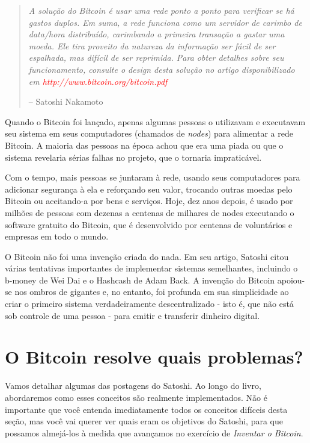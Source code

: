 \begin{quotation}
\begin{samepage}
{\textit{A solução do Bitcoin é usar uma rede ponto a ponto para verificar se há gastos duplos. Em suma, a rede funciona como um servidor de carimbo de data/hora distribuído, carimbando a primeira transação a gastar uma moeda. Ele tira proveito da natureza da informação ser fácil de ser espalhada, mas difícil de ser reprimida. Para obter detalhes sobre seu funcionamento, consulte o design desta solução no artigo disponibilizado em
\newline \textcolor{red}{http://www.bitcoin.org/bitcoin.pdf}}}
\begin{flushright} -- Satoshi Nakamoto
\end{flushright}\end{samepage}\end{quotation}

Quando o Bitcoin foi lançado, apenas algumas pessoas o utilizavam e executavam seu sistema em seus computadores (chamados de \textit{nodes}) para alimentar a rede Bitcoin. A maioria das pessoas na época achou que era uma piada ou que o sistema revelaria sérias falhas no projeto, que o tornaria impraticável.

Com o tempo, mais pessoas se juntaram à rede, usando seus computadores para adicionar segurança à ela e reforçando seu valor, trocando outras moedas pelo Bitcoin ou aceitando-a por bens e serviços. Hoje, dez anos depois, é usado por milhões de pessoas com dezenas a centenas de milhares de nodes executando o software gratuito do Bitcoin, que é desenvolvido por centenas de voluntários e empresas em todo o mundo.

O Bitcoin não foi uma invenção criada do nada. Em seu artigo, Satoshi citou várias tentativas importantes de implementar sistemas semelhantes, incluindo o b-money de Wei Dai e o Hashcash de Adam Back. A invenção do Bitcoin apoiou-se nos ombros de gigantes e, no entanto, foi profunda em sua simplicidade ao criar o primeiro sistema verdadeiramente descentralizado - isto é, que não está sob controle de uma pessoa - para emitir e transferir dinheiro digital.

\section*{O Bitcoin resolve quais problemas?}
 
Vamos detalhar algumas das postagens do Satoshi. Ao longo do livro, abordaremos como esses conceitos são realmente implementados. Não é importante que você entenda imediatamente todos os conceitos difíceis desta seção, mas você vai querer ver quais eram os objetivos do Satoshi, para que possamos almejá-los à medida que avançamos no exercício de \textit{Inventar o Bitcoin}.


